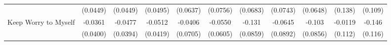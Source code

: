 {\begin{tabular}{l*{10}{c}}
            &    (0.0449)         &    (0.0449)         &    (0.0495)         &    (0.0637)         &    (0.0756)         &    (0.0683)         &    (0.0743)         &    (0.0648)         &     (0.138)         &     (0.109)         \\
\addlinespace
Keep Worry to Myself&     -0.0361         &     -0.0477         &     -0.0512         &     -0.0406         &     -0.0550         &      -0.131         &     -0.0645         &      -0.103         &     -0.0119         &      -0.146         \\
            &    (0.0400)         &    (0.0394)         &    (0.0419)         &    (0.0705)         &    (0.0605)         &    (0.0859)         &    (0.0892)         &    (0.0856)         &     (0.112)         &     (0.116)         \\
\bottomrule
\end{tabular}
}
